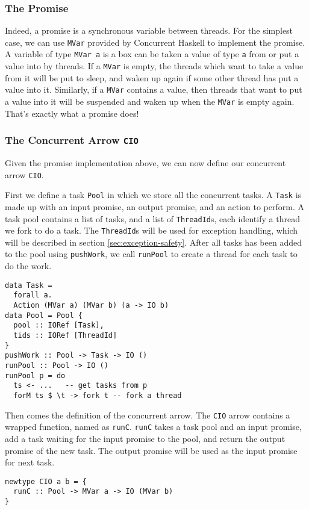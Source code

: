 \documentclass[conference]{IEEEtran}
\begin{document}
\subsubsection{The Promise}
Indeed, a promise is a synchronous variable between threads. For the simplest case, we can use \texttt{MVar}
provided by Concurrent Haskell\cite{Jones1996} to implement the promise.
A variable of type \texttt{MVar a} is a box can be
taken a value of type \texttt{a} from or put a value into by threads. If a \texttt{MVar} is empty,
the threads which want to take a value from it will be put to sleep, and waken up again if some other
thread has put a value into it. Similarly, if a \texttt{MVar} contains a value, then threads that want
to put a value into it will be suspended and waken up when the \texttt{MVar} is empty again. That's
exactly what a promise does!

\subsubsection{The Concurrent Arrow \texttt{CIO}}
Given the promise implementation above, we can now define our concurrent arrow \texttt{CIO}.

First we define a task \texttt{Pool} in which we store all the concurrent tasks. A \texttt{Task} is made up with
an input promise, an output promise, and an action to perform. A task pool contains a list of tasks,
and a list of \texttt{ThreadId}s, each identify a thread we fork to do a task. The \texttt{ThreadId}s
will be used for exception handling, which will be described in section \ref{sec:exception-safety}.
After all tasks has been
added to the pool using \texttt{pushWork}, we call \texttt{runPool} to create a thread for each task to
do the work.
\begin{verbatim}
data Task = 
  forall a.
  Action (MVar a) (MVar b) (a -> IO b)
data Pool = Pool {
  pool :: IORef [Task],
  tids :: IORef [ThreadId]
}
pushWork :: Pool -> Task -> IO ()
runPool :: Pool -> IO ()
runPool p = do
  ts <- ...   -- get tasks from p
  forM ts $ \t -> fork t -- fork a thread
\end{verbatim}

Then comes the definition of the concurrent arrow. The \texttt{CIO} arrow contains a wrapped function, named as
\texttt{runC}. \texttt{runC} takes a task pool and an input promise, add a task waiting for the input promise
to the pool, and return the output promise of the new task. The output promise will be used as the input
promise for next task.
\begin{verbatim}
newtype CIO a b = {
  runC :: Pool -> MVar a -> IO (MVar b)
}
\end{verbatim}
\end{document}

